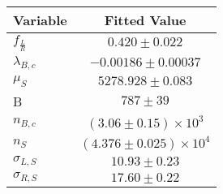 \begin{tabular}[t]{lc}
\hline
Variable &Fitted Value\\
\hline\hline
$f_{\frac{L}{R}}$&$0.420\pm0.022$\\
\hline
$\lambda_{B,c}$&$-0.00186\pm0.00037$\\
\hline
$\mu_S$&$5278.928\pm0.083$\\
\hline
B&$787\pm39$\\
\hline
$n_{B,c}$&$(3.06\pm0.15)\times 10^3$\\
\hline
$n_S$&$(4.376\pm0.025)\times 10^4$\\
\hline
$\sigma_{L, S}$&$10.93\pm0.23$\\
\hline
$\sigma_{R, S}$&$17.60\pm0.22$\\
\hline
\end{tabular}